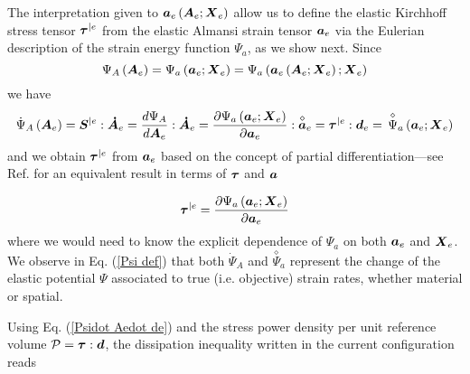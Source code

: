 \documentclass[preprint,review,12pt,sort&compress]{elsarticle}%
\renewcommand{\mathbf}[1]{\mbox{\boldmath $#1$ \unboldmath}  \!\!}
\begin{document}
The interpretation given to $\mathbf{a}_{e}\left(  \mathbf{A}_{e}%
;\mathbf{X}_{e}\right)  $ allow us to define the elastic Kirchhoff stress
tensor $\mathbf{\tau}^{|e}$ from the elastic Almansi strain tensor
$\mathbf{a}_{e}$ via the Eulerian description of the strain energy function
$\Psi_{a}$, as we show next. Since%
\begin{equation}
\Psi_{A}\left(  \mathbf{A}_{e}\right)  =\Psi_{a}\left(  \mathbf{a}%
_{e};\mathbf{X}_{e}\right)  =\Psi_{a}\left(  \mathbf{a}_{e}\left(
\mathbf{A}_{e};\mathbf{X}_{e}\right)  ;\mathbf{X}_{e}\right)
\end{equation}
we have%
\begin{equation}
\dot{\Psi}_{A}\left(  \mathbf{A}_{e}\right)  =\mathbf{S}^{|e}:\mathbf{\dot{A}%
}_{e}=\frac{d\Psi_{A}}{d\mathbf{A}_{e}}:\mathbf{\dot{A}}_{e}=\frac
{\partial\Psi_{a}\left(  \mathbf{a}_{e};\mathbf{X}_{e}\right)  }%
{\partial\mathbf{a}_{e}}:\overset{\diamond}{\mathbf{a}}_{e}=\mathbf{\tau}%
^{|e}:\mathbf{d}_{e}=\,\overset{\diamond}{\Psi}_{a}\left(  \mathbf{a}%
_{e};\mathbf{X}_{e}\right)  \label{Psi def}%
\end{equation}
and we obtain $\mathbf{\tau}^{|e}$ from $\mathbf{a}_{e}$ based on the concept
of partial differentiation---see Ref. \cite{LatMonAPM2016} for an equivalent
result in terms of $\mathbf{\tau}$ and $\mathbf{a}$%

\begin{equation}
\mathbf{\tau}^{|e}=\frac{\partial\Psi_{a}\left(  \mathbf{a}_{e};\mathbf{X}%
_{e}\right)  }{\partial\mathbf{a}_{e}} \label{tauext and tauint}%
\end{equation}
where we would need to know the explicit dependence of $\Psi_{a}$ on both
$\mathbf{a}_{e}$ and $\mathbf{X}_{e}$. We observe in Eq. (\ref{Psi def}) that
both $\dot{\Psi}_{A}$ and $\overset{\diamond}{\Psi}_{a}$ represent the change
of the elastic potential $\Psi$ associated to true (i.e. objective) strain
rates, whether material or spatial.

Using Eq. (\ref{Psidot Aedot de}) and the stress power density per unit
reference volume $\mathcal{P}=\mathbf{\tau}:\mathbf{d}$, the dissipation
inequality written in the current configuration reads%
\end{document}
